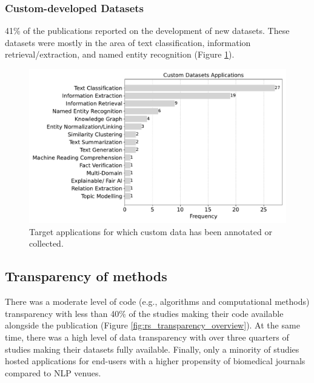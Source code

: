 \documentclass[fleqn,10pt]{olplainarticle}
\begin{document}

\subsubsection*{Custom-developed Datasets}

41\% of the publications reported on the development of new datasets. These datasets were mostly in the area of text classification, information retrieval/extraction, and named entity recognition (Figure \ref{fig:custom_data}).

\begin{figure}[!h]
\begin{center}
\includegraphics[scale=0.4]{visuals/new_pdf/custom_dataset_nlp_task_2024.pdf} %
\caption{Target applications for which custom data has been annotated or collected.}
\label{fig:custom_data}
\end{center}
\end{figure}

\subsection*{Transparency of methods}
There was a moderate level of code (e.g., algorithms and computational methods) transparency with less than 40\% of the studies making their code available alongside the publication (Figure \ref{fig:rs_transparency_overview}). At the same time, there was a high level of data transparency with over three quarters of studies making their datasets fully available. Finally, only a minority of studies hosted applications for end-users with a higher propensity of biomedical journals compared to NLP venues.
\end{document}
